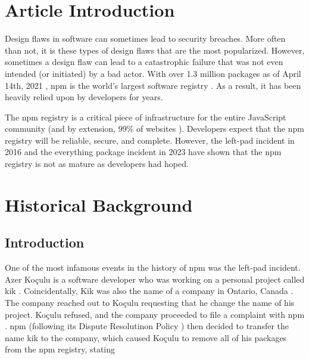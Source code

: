\documentclass[acmsmall]{acmart}
\begin{document}

\maketitle

\fancyfoot{}
\thispagestyle{empty}

\section{Article Introduction}
Design flaws in software can sometimes lead to security breaches. More often
than not, it is these types of design flaws that are the most popularized.
However, sometimes a design flaw can lead to a catastrophic failure that was not
even intended (or initiated) by a bad actor. With over 1.3 million packages as
of April 14th, 2021 \cite{npmblog-stats}, npm is the world's largest software
registry \cite{aboutnpm,w3schools}. As a result, it has been heavily relied upon
by developers for years.

The npm registry is a critical piece of infrastructure for the entire JavaScript
community (and by extension, 99\% of websites \cite{w3techs}). Developers expect
that the npm registry will be reliable, secure, and complete. However, the
left-pad incident in 2016 \cite{npmblog-leftpad} and the everything package
incident in 2023 \cite{youtube-everything} have shown that the npm registry is
not as mature as developers had hoped.

\section{Historical Background}
\subsection{Introduction}
One of the most infamous events in the history of npm was the left-pad incident.
Azer Koçulu is a software developer who was working on a personal project called
kik \cite{qz}. Coincidentally, Kik was also the name of a company in Ontario,
Canada \cite{qz, crunchbase}. The company reached out to Koçulu requesting that
he change the name of his project. Koçulu refused, and the company proceeded to
file a complaint with npm \cite{qz}. npm (following its Dispute Resolutinon
Policy \cite{npm-dispute-policy}) then decided to transfer the name kik to the
company, which caused Koçulu to remove all of his packages from the npm
registry, stating
\end{document}
